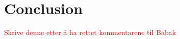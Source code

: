 \chapter{Conclusion} \label{sec:conclusion}
\textcolor{red}{Skrive denne etter å ha rettet kommentarene til Babak}
